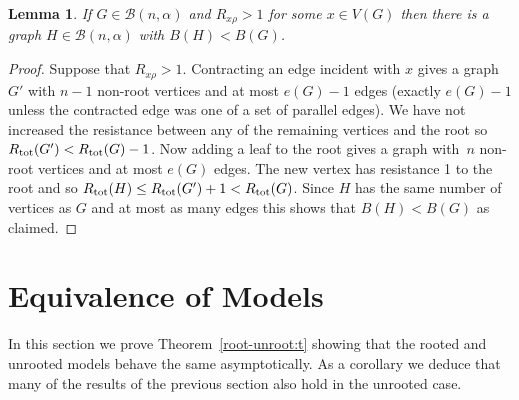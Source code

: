 \documentclass[11pt]{article}
\newtheorem{lemma}[theorem]{Lemma}
\theoremstyle{remark}
\def\a{\alpha}
\newcommand\rtot{R_{{\rm tot}}}
\def\cB{\mathcal{B}}
\begin{document}
\begin{lemma}\label{contract:lem}
  If $G\in\cB(n,\a)$ and $R_{x\rho}>1$ for some $x\in V(G)$ then there is a
  graph $H\in\cB(n,\a)$ with $B(H)<B(G)$. 
\end{lemma}
 
\begin{proof}
  Suppose that $R_{x\rho}>1$. Contracting an edge incident with $x$
  gives a graph $G'$ with $n-1$ non-root vertices and at most $e(G)-1$
  edges (exactly $e(G)-1$ unless the contracted edge was one of a set
  of parallel edges). We have not increased the resistance between any
  of the remaining vertices and the root so
  $\rtot(G')<\rtot(G)-1$. Now adding a leaf to the root gives a graph
  with~$n$ non-root vertices and at most $e(G)$ edges. The new vertex
  has resistance 1 to the root and so $\rtot(H)\leq
  \rtot(G')+1<\rtot(G)$. Since $H$ has the same number of vertices as
  $G$ and at most as many edges this shows that $B(H)<B(G)$ as
  claimed.
\end{proof}

\section{Equivalence of Models}\label{section:equivalence}

In this section we prove Theorem~\ref{root-unroot:t}
showing that the rooted and unrooted models behave the same
asymptotically. As a corollary we deduce that many of the results of
the previous section also hold in the unrooted case.
\end{document}
